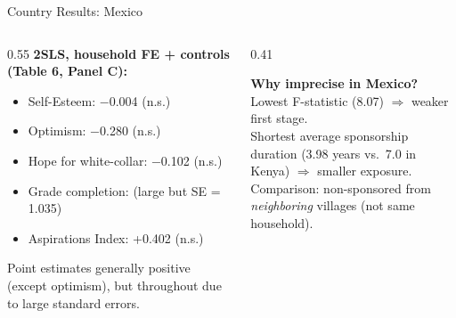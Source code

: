\documentclass[aspectratio=169, 10pt]{beamer}
\begin{document}
\begin{frame}{Country Results: Mexico}
  \begin{columns}
    \begin{column}{0.55\textwidth}
      \textbf{2SLS, household FE + controls (Table 6, Panel C):}
      \begin{itemize}
        \item Self-Esteem: $-$0.004 (n.s.)
        \item Optimism: $-$0.280 (n.s.)
        \item Hope for white-collar: $-$0.102 (n.s.)
        \item Grade completion:  (large but SE = 1.035)
        \item Aspirations Index: +0.402 (n.s.)
      \end{itemize}
      \vspace{0.4em}
      Point estimates generally positive (except optimism), but  throughout due to large standard errors.
    \end{column}
    \begin{column}{0.41\textwidth}
      \begin{methodbox}
        \textbf{Why imprecise in Mexico?}\\[0.4em]
        Lowest F-statistic (8.07) $\Rightarrow$ weaker first stage.\\[0.3em]
        Shortest average sponsorship duration (3.98 years vs.\ 7.0 in Kenya) $\Rightarrow$ smaller exposure.\\[0.3em]
        Comparison: non-sponsored from \emph{neighboring} villages (not same household).
      \end{methodbox}
    \end{column}
  \end{columns}
\end{frame}
\end{document}

